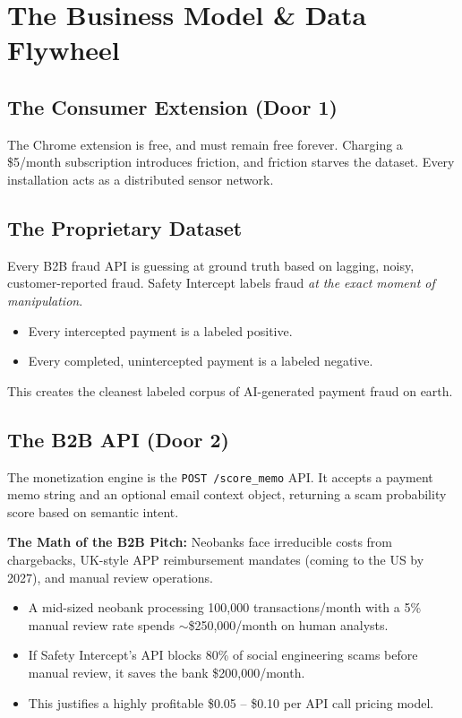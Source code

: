 \documentclass[12pt, letterpaper]{article}
\begin{document}
\newpage
\section{The Business Model \& Data Flywheel}

\subsection{The Consumer Extension (Door 1)}
The Chrome extension is free, and must remain free forever. Charging a \$5/month subscription introduces friction, and friction starves the dataset. Every installation acts as a distributed sensor network. 

\subsection{The Proprietary Dataset}
Every B2B fraud API is guessing at ground truth based on lagging, noisy, customer-reported fraud. Safety Intercept labels fraud \textit{at the exact moment of manipulation}. 
\begin{itemize}
    \item Every intercepted payment is a labeled positive.
    \item Every completed, unintercepted payment is a labeled negative.
\end{itemize}
This creates the cleanest labeled corpus of AI-generated payment fraud on earth.

\subsection{The B2B API (Door 2)}
The monetization engine is the \texttt{POST /score\_memo} API. It accepts a payment memo string and an optional email context object, returning a scam probability score based on semantic intent. 

\textbf{The Math of the B2B Pitch:}
Neobanks face irreducible costs from chargebacks, UK-style APP reimbursement mandates (coming to the US by 2027), and manual review operations. 
\begin{itemize}
    \item A mid-sized neobank processing 100,000 transactions/month with a 5\% manual review rate spends $\sim$\$250,000/month on human analysts.
    \item If Safety Intercept's API blocks 80\% of social engineering scams before manual review, it saves the bank \$200,000/month.
    \item This justifies a highly profitable \$0.05 -- \$0.10 per API call pricing model.
\end{itemize}
\end{document}
